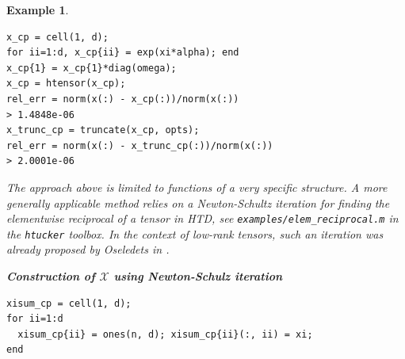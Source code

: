 \documentclass[11pt, a4paper]{article}
\newcommand{\calX}{\mathcal{X}}
\newcommand{\htucker}{{\tt htucker}}
\newtheorem{example}[theorem]{\bf Example}
\begin{document}
\begin{example}
\begin{framed}
\begin{verbatim}
x_cp = cell(1, d);
for ii=1:d, x_cp{ii} = exp(xi*alpha); end
x_cp{1} = x_cp{1}*diag(omega);
x_cp = htensor(x_cp);
rel_err = norm(x(:) - x_cp(:))/norm(x(:))
> 1.4848e-06
x_trunc_cp = truncate(x_cp, opts);
rel_err = norm(x(:) - x_trunc_cp(:))/norm(x(:))
> 2.0001e-06
\end{verbatim}\vspace{-1ex}
\end{framed}
The approach above is limited to functions of a very
specific structure. A more generally applicable method relies on a
Newton-Schultz iteration for finding the elementwise reciprocal of a
tensor in HTD, see \texttt{examples/elem\_reciprocal.m}
in the \htucker{} toolbox. In the context of low-rank tensors, such an iteration was
already proposed by Oseledets in \cite{tttoolboxv1}.
\begin{framed}\small \noindent
\textbf{Construction of $\calX$ using Newton-Schulz iteration}\\
\vspace{-3ex} 
\begin{verbatim}
xisum_cp = cell(1, d);
for ii=1:d
  xisum_cp{ii} = ones(n, d); xisum_cp{ii}(:, ii) = xi;
end


\end{verbatim}
\end{framed}
\end{example}
\end{document}
